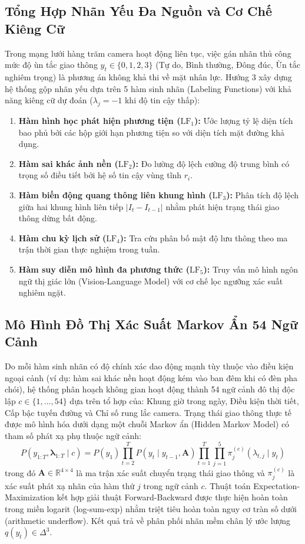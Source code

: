 \documentclass[11pt,a4paper]{article}
\begin{document}
\subsection{Tổng Hợp Nhãn Yếu Đa Nguồn và Cơ Chế Kiêng Cữ}
Trong mạng lưới hàng trăm camera hoạt động liên tục, việc gán nhãn thủ công mức độ ùn tắc giao thông $y_t \in \{0, 1, 2, 3\}$ (Tự do, Bình thường, Đông đúc, Ùn tắc nghiêm trọng) là phương án không khả thi về mặt nhân lực. Hướng 3 xây dựng hệ thống gộp nhãn yếu dựa trên 5 hàm sinh nhãn (Labeling Functions) với khả năng kiêng cữ dự đoán ($\lambda_j = -1$ khi độ tin cậy thấp):
\begin{enumerate}
    \item \textbf{Hàm hình học phát hiện phương tiện ($\text{LF}_1$):} Ước lượng tỷ lệ diện tích bao phủ bởi các hộp giới hạn phương tiện so với diện tích mặt đường khả dụng.
    \item \textbf{Hàm sai khác ảnh nền ($\text{LF}_2$):} Đo lường độ lệch cường độ trung bình có trọng số điều tiết bởi hệ số tin cậy vùng tĩnh $r_i$.
    \item \textbf{Hàm biến động quang thông liên khung hình ($\text{LF}_3$):} Phân tích độ lệch giữa hai khung hình liên tiếp $|I_t - I_{t-1}|$ nhằm phát hiện trạng thái giao thông dừng bất động.
    \item \textbf{Hàm chu kỳ lịch sử ($\text{LF}_4$):} Tra cứu phân bố mật độ lưu thông theo ma trận thời gian thực nghiệm trong tuần.
    \item \textbf{Hàm suy diễn mô hình đa phương thức ($\text{LF}_5$):} Truy vấn mô hình ngôn ngữ thị giác lớn (Vision-Language Model) với cơ chế lọc ngưỡng xác suất nghiêm ngặt.
\end{enumerate}

\subsection{Mô Hình Đồ Thị Xác Suất Markov Ẩn 54 Ngữ Cảnh}
Do mỗi hàm sinh nhãn có độ chính xác dao động mạnh tùy thuộc vào điều kiện ngoại cảnh (ví dụ: hàm sai khác nền hoạt động kém vào ban đêm khi có đèn pha chói), hệ thống phân hoạch không gian hoạt động thành 54 ngữ cảnh đô thị độc lập $c \in \{1, \dots, 54\}$ dựa trên tổ hợp của: Khung giờ trong ngày, Điều kiện thời tiết, Cấp bậc tuyến đường và Chỉ số rung lắc camera.
Trạng thái giao thông thực tế được mô hình hóa dưới dạng một chuỗi Markov ẩn (Hidden Markov Model) có tham số phát xạ phụ thuộc ngữ cảnh:
\begin{equation}
    P(y_{1:T}, \bm{\lambda}_{1:T} \mid c) = P(y_1) \prod_{t=2}^T P(y_t \mid y_{t-1}, \mathbf{A}) \prod_{t=1}^T \prod_{j=1}^5 \pi_j^{(c)}(\lambda_{t, j} \mid y_t)
\end{equation}
trong đó $\mathbf{A} \in \mathbb{R}^{4 \times 4}$ là ma trận xác suất chuyển trạng thái giao thông và $\pi_j^{(c)}$ là xác suất phát xạ nhãn của hàm thứ $j$ trong ngữ cảnh $c$.
Thuật toán Expectation-Maximization kết hợp giải thuật Forward-Backward được thực hiện hoàn toàn trong miền logarit (log-sum-exp) nhằm triệt tiêu hoàn toàn nguy cơ tràn số dưới (arithmetic underflow). Kết quả trả về phân phối nhãn mềm chân lý ước lượng $q(y_t) \in \Delta^3$.
\end{document}
